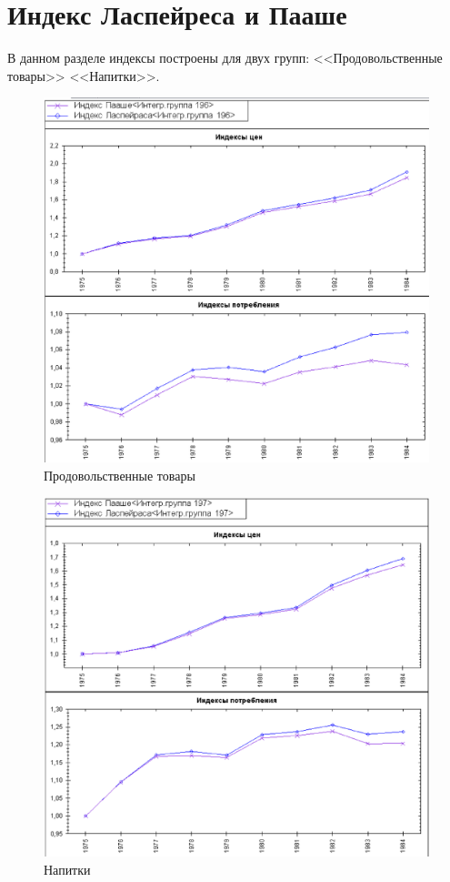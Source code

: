\documentclass[12pt]{article}
\theoremstyle{rusdef}
\begin{document}
\section{Индекс Ласпейреса и Пааше}
В данном разделе индексы построены для двух групп: <<Продовольственные товары>> <<Напитки>>.
\begin{figure}[h!]
	\centering
	\includegraphics[scale=0.6]{pics/pic2.eps}
	\caption{Продовольственные товары}
\end{figure}
\begin{figure}[h!]
	\centering
	\includegraphics[scale=0.6]{pics/pic3.eps}
	\caption{Напитки}
\end{figure}
\end{document}
